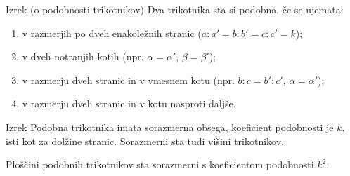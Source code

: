         
        \begin{frame}
            \begin{block}{Izrek (o podobnosti trikotnikov)}
                Dva trikotnika sta si podobna, če se ujemata:
                \begin{enumerate}
                    \item v razmerjih po dveh enakoležnih stranic ($a:a'=b:b'=c:c'=k$);
                    \item v dveh notranjih kotih (npr. $\alpha=\alpha'$, $\beta=\beta'$);
                    \item v razmerju dveh stranic in v vmesnem kotu (npr. $b:c=b':c'$, $\alpha=\alpha'$);
                    \item v razmerju dveh stranic in v kotu nasproti daljše.
                \end{enumerate}
            \end{block}

            \begin{block}{Izrek}
                Podobna trikotnika imata sorazmerna obsega, koeficient podobnosti je $k$, isti kot za dolžine stranic.
                Sorazmerni sta tudi višini trikotnikov.

                Ploščini podobnih trikotnikov sta sorazmerni s koeficientom podobnosti $k^2$.
            \end{block}
        \end{frame}

